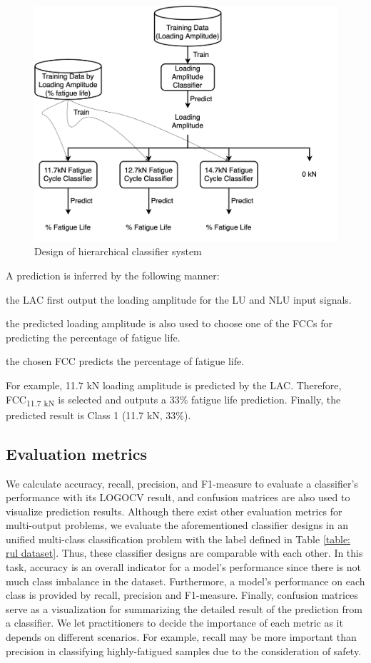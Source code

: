 \begin{figure}[tb]
    \centering
    \includegraphics[width=0.9\linewidth]{fig/hierarchical_classifier.png}
    \caption{Design of hierarchical classifier system}
    \label{fig: hierarchical classifier}
\end{figure}


A prediction is inferred by the following manner: 
\begin{enumerate*}[label=\itshape\alph*\upshape)]
    \item the LAC first output the loading amplitude for the LU and NLU input signals.
    \item the predicted loading amplitude is also used to choose one of the FCCs for predicting the percentage of fatigue life.
    \item the chosen FCC predicts the percentage of fatigue life.
\end{enumerate*}
For example, 11.7 kN loading amplitude is predicted by the LAC. Therefore, FCC\textsubscript{11.7 kN} is selected and outputs a 33\% fatigue life prediction. Finally, the predicted result is Class 1 (11.7 kN, 33\%).

\subsection{Evaluation metrics}
We calculate accuracy, recall, precision, and F1-measure to evaluate a classifier's performance with its LOGOCV result, and confusion matrices are also used to visualize prediction results. Although there exist other evaluation metrics for multi-output problems, we evaluate the aforementioned classifier designs in an unified multi-class classification problem with the label defined in Table \ref{table: rul dataset}. Thus, these classifier designs are comparable with each other. In this task, accuracy is an overall indicator for a model's performance since there is not much class imbalance in the dataset. Furthermore, a model's performance on each class is provided by recall, precision and F1-measure. Finally, confusion matrices serve as a visualization for summarizing the detailed result of the prediction from a classifier. We let practitioners to decide the importance of each metric as it depends on different scenarios. For example, recall may be more important than precision in classifying highly-fatigued samples due to the consideration of safety.

